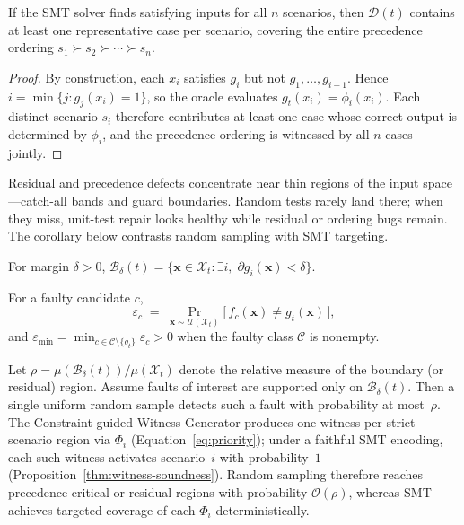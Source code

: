 \begin{lemma}
\label{lem:coverage}
If the SMT solver finds satisfying inputs for all $n$ scenarios, then
$\mathcal{D}(t)$ contains at least one representative case per scenario,
covering the entire precedence ordering $s_1 \succ s_2 \succ \cdots \succ s_n$.
\end{lemma}

\begin{proof}
By construction, each $x_i$ satisfies $g_i$ but not $g_1, \ldots, g_{i-1}$.
Hence $i = \min\{j : g_j(x_i) = 1\}$, so the oracle evaluates
$g_t(x_i) = \phi_i(x_i)$.  Each distinct scenario $s_i$ therefore
contributes at least one case whose correct output is determined by
$\phi_i$, and the precedence ordering is witnessed by all $n$ cases jointly.
\end{proof}

Residual and precedence defects concentrate near thin regions of the input
space---catch-all bands and guard boundaries.
Random tests rarely land there; when they miss, unit-test repair looks
healthy while residual or ordering bugs remain.
The corollary below contrasts random sampling with SMT targeting.

\begin{definition}
\label{def:boundary-region}
For margin $\delta > 0$,
$\mathcal{B}_\delta(t) = \{\mathbf{x} \in \mathcal{X}_t :
  \exists i,\; \partial g_i(\mathbf{x}) < \delta\}$.
\end{definition}

\begin{definition}
\label{def:fault-exposure}
For a faulty candidate $c$,
\[
  \varepsilon_c \;=\;
  \Pr_{\mathbf{x} \sim \mathcal{U}(\mathcal{X}_t)}
  \bigl[\,f_c(\mathbf{x}) \neq g_t(\mathbf{x})\,\bigr],
\]
and $\varepsilon_{\min} = \min_{c \in \mathcal{C}\setminus\{g_t\}}
\varepsilon_c > 0$ when the faulty class $\mathcal{C}$ is nonempty.
\end{definition}

\begin{corollary}
\label{cor:random-vs-smt}
Let
$\rho = \mu(\mathcal{B}_\delta(t))/\mu(\mathcal{X}_t)$
denote the relative measure of the boundary (or residual) region.
Assume faults of interest are supported only on
$\mathcal{B}_\delta(t)$.
Then a single uniform random sample detects such a fault with probability at
most~$\rho$.
The Constraint-guided Witness Generator produces one witness per strict
scenario region via $\Phi_i$ (Equation~\eqref{eq:priority}); under a faithful
SMT encoding, each such witness activates scenario~$i$ with probability~$1$
(Proposition~\ref{thm:witness-soundness}).
Random sampling therefore reaches precedence-critical or residual regions
with probability $\mathcal{O}(\rho)$, whereas SMT achieves targeted coverage
of each $\Phi_i$ deterministically.
\end{corollary}


